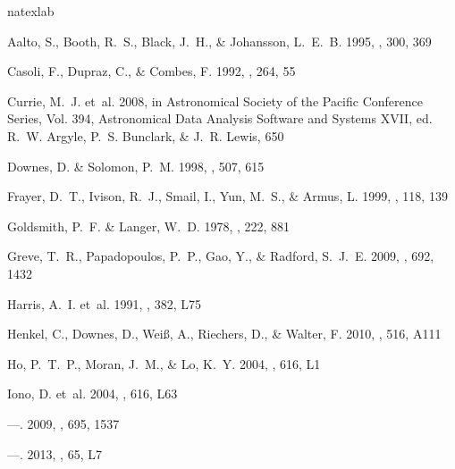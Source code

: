 \begin{thebibliography}{37}
\expandafter\ifx\csname natexlab\endcsname\relax\def\natexlab#1{#1}\fi

{Aalto}, S., {Booth}, R.~S., {Black}, J.~H., \& {Johansson}, L.~E.~B. 1995,
  \aap, 300, 369

{Casoli}, F., {Dupraz}, C., \& {Combes}, F. 1992, \aap, 264, 55

{Currie}, M.~J. {et~al.} 2008, in Astronomical Society of the Pacific
  Conference Series, Vol. 394, Astronomical Data Analysis Software and Systems
  XVII, ed. R.~W. {Argyle}, P.~S. {Bunclark}, \& J.~R. {Lewis}, 650

{Downes}, D. \& {Solomon}, P.~M. 1998, \apj, 507, 615

{Frayer}, D.~T., {Ivison}, R.~J., {Smail}, I., {Yun}, M.~S., \& {Armus}, L.
  1999, \aj, 118, 139

{Goldsmith}, P.~F. \& {Langer}, W.~D. 1978, \apj, 222, 881

{Greve}, T.~R., {Papadopoulos}, P.~P., {Gao}, Y., \& {Radford}, S.~J.~E. 2009,
  \apj, 692, 1432

{Harris}, A.~I. {et~al.} 1991, \apjl, 382, L75

{Henkel}, C., {Downes}, D., {Wei{\ss}}, A., {Riechers}, D., \& {Walter}, F.
  2010, \aap, 516, A111

{Ho}, P.~T.~P., {Moran}, J.~M., \& {Lo}, K.~Y. 2004, \apjl, 616, L1

{Iono}, D. {et~al.} 2004, \apjl, 616, L63

---. 2009, \apj, 695, 1537

---. 2013, \pasj, 65, L7


\end{thebibliography}
